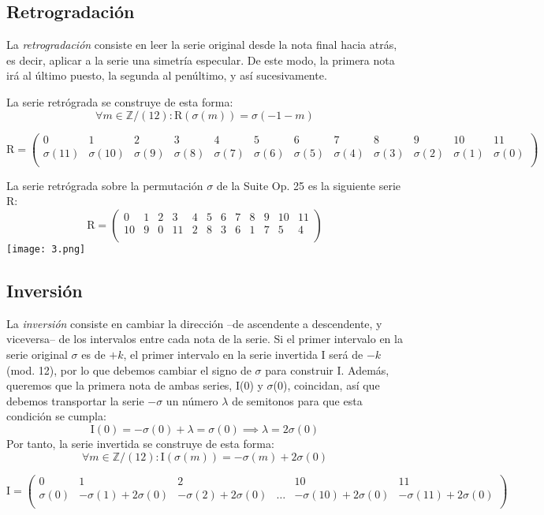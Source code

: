 	\subsection{Retrogradación}
		La \emph{retrogradación} consiste en leer la serie original desde la nota final hacia atrás, es decir, aplicar a la serie una simetría especular. De este modo, la primera nota irá al último puesto, la segunda al penúltimo, y así sucesivamente.
		
		La serie retrógrada se construye de esta forma:
		$$
		\forall m\in \mathbb{Z} / (12):	\text{R}\left(\sigma\left(m\right)\right)=\sigma\left(-1-m\right)$$ \begin{footnotesize}$$			\text{R}=\left(\begin{matrix}0&1&2&3&4&5&6&7&8&9&10&11\\	\sigma(11)&\sigma(10)&\sigma(9)&\sigma(8)&\sigma(7)&\sigma(6)&\sigma(5)&\sigma(4)&\sigma(3)&\sigma(2)&\sigma(1)&\sigma(0)\\\end{matrix}\right)
			$$\end{footnotesize}
			
		La serie retrógrada sobre la permutación $\sigma$ de la Suite Op. 25 es la siguiente serie R:	
		$$\text{R}=\left(\begin{matrix}0&1&2&3&4&5&6&7&8&9&10&11\\10&9&0&11&2&8&3&6&1&7&5&4\\\end{matrix}\right)$$		
		\texttt{[image: 3.png]}
		
	\subsection{Inversión}
		La \emph{inversión} consiste en cambiar la dirección --de ascendente a descendente, y viceversa-- de los intervalos entre cada nota de la serie. Si el primer intervalo en la serie original $\sigma$ es de $+k$, el primer intervalo en la serie invertida I será de $-k$ (mod. 12), por lo que debemos cambiar el signo de $\sigma$ para construir I. Además, queremos que la primera nota de ambas series, I(0) y $\sigma$(0), coincidan, así que debemos transportar la serie $-\sigma$ un número $\lambda$ de semitonos para que esta condición se cumpla:
		$$\text{I}(0)=-\sigma\left(0\right)+\lambda=\sigma\left(0\right)\implies \lambda=2\sigma(0)$$
		Por tanto, la serie invertida se construye de esta forma:
		$$
		\forall m\in \mathbb{Z} / (12):	\text{I}\left(\sigma\left(m\right)\right)=-\sigma\left(m\right)+2\sigma\left(0\right)
		$$
		\begin{footnotesize}	$$
		\text{I}=\left(\begin{matrix}0&1&2&&10&11\\\sigma(0)&-\sigma(1)+2\sigma(0)&-\sigma(2)+2\sigma(0)&\ldots&-\sigma(10)+2\sigma(0)&-\sigma(11)+2\sigma(0)\\\end{matrix}\right)
		$$	\end{footnotesize}
		
